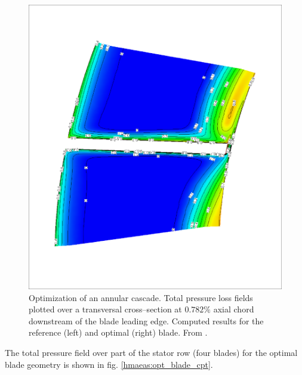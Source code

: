 \documentclass{vki_ls}
\begin{document}
\begin{figure}[h!]
\begin{minipage}{.49\linewidth}
       \includegraphics[angle=270,scale=0.3]{hmaeas/b_b_img.eps}
    \end{minipage}
    \caption{Optimization of an annular cascade. Total pressure loss
             fields plotted over a transversal cross--section at $0.782\%$
             axial chord downstream of the blade leading edge.
             Computed results for the reference (left) and
             optimal (right) blade. From \cite{LTT_4_05}.}
    \label{hmaeas:ntua_blade_cpt}
\end{figure}
%
The  total pressure field over part of the stator row (four blades) for the optimal blade geometry is shown in fig. \ref{hmaeas:opt_blade_cpt}. 
%
\end{document}
